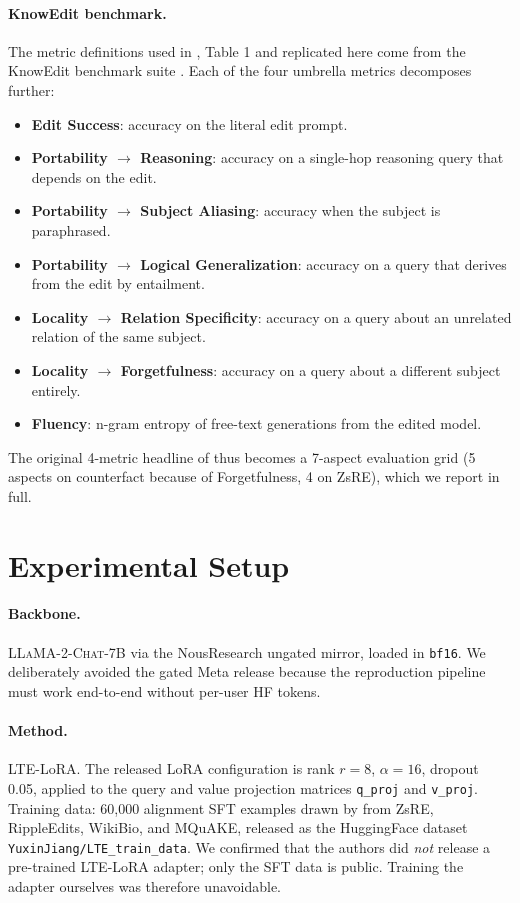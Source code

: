 \documentclass[11pt,a4paper,twocolumn]{article}
\begin{document}
\paragraph{KnowEdit benchmark.} The metric definitions used in \citet{jiang2024learning}, Table 1 and replicated here come from the KnowEdit benchmark suite \citep{zhang2024comprehensive}. Each of the four umbrella metrics decomposes further:
\begin{itemize}[leftmargin=1em,itemsep=0pt,topsep=2pt]
\item \textbf{Edit Success}: accuracy on the literal edit prompt.
\item \textbf{Portability $\rightarrow$ Reasoning}: accuracy on a single-hop reasoning query that depends on the edit.
\item \textbf{Portability $\rightarrow$ Subject Aliasing}: accuracy when the subject is paraphrased.
\item \textbf{Portability $\rightarrow$ Logical Generalization}: accuracy on a query that derives from the edit by entailment.
\item \textbf{Locality $\rightarrow$ Relation Specificity}: accuracy on a query about an unrelated relation of the same subject.
\item \textbf{Locality $\rightarrow$ Forgetfulness}: accuracy on a query about a different subject entirely.
\item \textbf{Fluency}: n-gram entropy of free-text generations from the edited model.
\end{itemize}
The original 4-metric headline of \citet{jiang2024learning} thus becomes a 7-aspect evaluation grid (5 aspects on counterfact because of Forgetfulness, 4 on ZsRE), which we report in full.

\section{Experimental Setup}
\label{sec:setup}

\paragraph{Backbone.} \textsc{LLaMA-2-Chat-7B} via the NousResearch ungated mirror, loaded in \texttt{bf16}. We deliberately avoided the gated Meta release because the reproduction pipeline must work end-to-end without per-user HF tokens.

\paragraph{Method.} LTE-LoRA. The released LoRA configuration is rank $r=8$, $\alpha=16$, dropout 0.05, applied to the query and value projection matrices \texttt{q\_proj} and \texttt{v\_proj}. Training data: 60{,}000 alignment SFT examples drawn by \citet{jiang2024learning} from ZsRE, RippleEdits, WikiBio, and MQuAKE, released as the HuggingFace dataset \texttt{YuxinJiang/LTE\_train\_data}. We confirmed that the authors did \emph{not} release a pre-trained LTE-LoRA adapter; only the SFT data is public. Training the adapter ourselves was therefore unavoidable.
\end{document}
